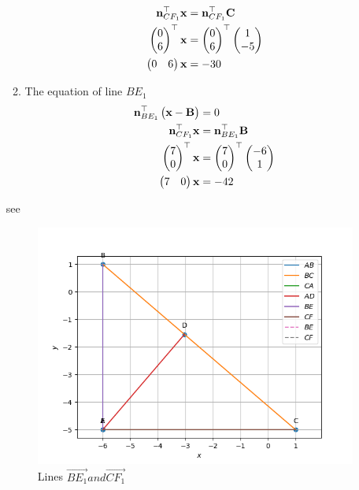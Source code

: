 \documentclass[11pt]{book}
\begin{document}
\begin{enumerate}[label=\thesection.\arabic*.,ref=\thesection.\theenumi]
\begin{enumerate}
\begin{align}
          \mathbf{n}^{\top}_{CF_1}\mathbf{x}&= \mathbf{n}^{\top}_{CF_1}\mathbf{C} \\
          \begin{pmatrix}0 \\6\end{pmatrix}^{\top}\mathbf{x}&=\begin{pmatrix}0 \\ 6\end{pmatrix}^{\top}\begin{pmatrix}1 \\ -5\end{pmatrix}\\
          \begin{pmatrix}0 & 6\end{pmatrix}\mathbf{x}&=-30
      \end{align}
      \item The equation of line $BE_1$
      \begin{align}
          \mathbf{n}^{\top}_{BE_1}\begin{pmatrix}\mathbf{x}-\mathbf{B}\end{pmatrix}&=0 \\
          \mathbf{n}^{\top}_{CF_1}\mathbf{x}&= \mathbf{n}^{\top}_{BE_1}\mathbf{B} \\
          \begin{pmatrix}7 \\0\end{pmatrix}^{\top}\mathbf{x}&=\begin{pmatrix}7 \\ 0\end{pmatrix}^{\top}\begin{pmatrix}-6 \\ 1\end{pmatrix}\\
          \begin{pmatrix}7 & 0\end{pmatrix}\mathbf{x}&=-42
      \end{align}
  \end{enumerate}
  see 
  \begin{figure}[H]
      \centering
      \includegraphics{figs/BE&CF.png}
      \caption{Lines $\vec{BE_1} and \vec{CF_1}$}
      \label{fig:line_BE1_CF1}
  \end{figure}
  


\end{enumerate}
\end{document}
